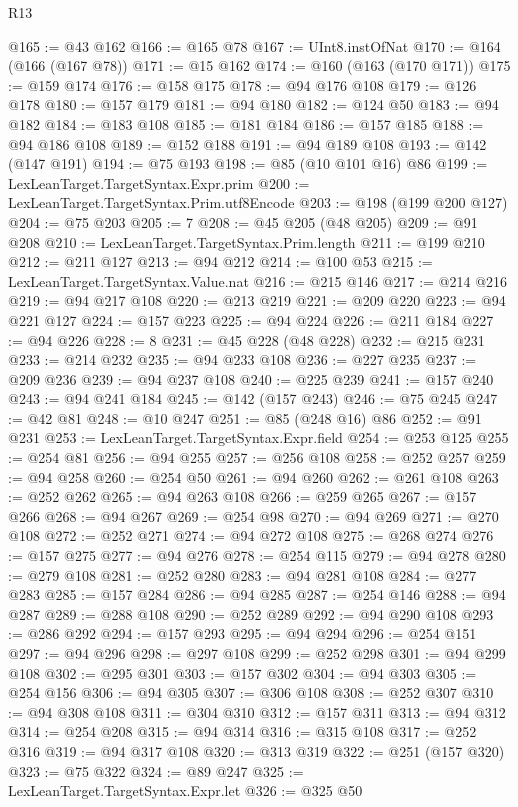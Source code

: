 \begin{lexlean}{R13}
\begin{coremodule}
@165 := @43 @162
@166 := @165 @78
@167 := UInt8.instOfNat
@170 := @164 (@166 (@167 @78))
@171 := @15 @162
@174 := @160 (@163 (@170 @171))
@175 := @159 @174
@176 := @158 @175
@178 := @94 @176 @108
@179 := @126 @178
@180 := @157 @179
@181 := @94 @180
@182 := @124 @50
@183 := @94 @182
@184 := @183 @108
@185 := @181 @184
@186 := @157 @185
@188 := @94 @186 @108
@189 := @152 @188
@191 := @94 @189 @108
@193 := @142 (@147 @191)
@194 := @75 @193
@198 := @85 (@10 @101 @16) @86
@199 := LexLeanTarget.TargetSyntax.Expr.prim
@200 := LexLeanTarget.TargetSyntax.Prim.utf8Encode
@203 := @198 (@199 @200 @127)
@204 := @75 @203
@205 := 7
@208 := @45 @205 (@48 @205)
@209 := @91 @208
@210 := LexLeanTarget.TargetSyntax.Prim.length
@211 := @199 @210
@212 := @211 @127
@213 := @94 @212
@214 := @100 @53
@215 := LexLeanTarget.TargetSyntax.Value.nat
@216 := @215 @146
@217 := @214 @216
@219 := @94 @217 @108
@220 := @213 @219
@221 := @209 @220
@223 := @94 @221 @127
@224 := @157 @223
@225 := @94 @224
@226 := @211 @184
@227 := @94 @226
@228 := 8
@231 := @45 @228 (@48 @228)
@232 := @215 @231
@233 := @214 @232
@235 := @94 @233 @108
@236 := @227 @235
@237 := @209 @236
@239 := @94 @237 @108
@240 := @225 @239
@241 := @157 @240
@243 := @94 @241 @184
@245 := @142 (@157 @243)
@246 := @75 @245
@247 := @42 @81
@248 := @10 @247
@251 := @85 (@248 @16) @86
@252 := @91 @231
@253 := LexLeanTarget.TargetSyntax.Expr.field
@254 := @253 @125
@255 := @254 @81
@256 := @94 @255
@257 := @256 @108
@258 := @252 @257
@259 := @94 @258
@260 := @254 @50
@261 := @94 @260
@262 := @261 @108
@263 := @252 @262
@265 := @94 @263 @108
@266 := @259 @265
@267 := @157 @266
@268 := @94 @267
@269 := @254 @98
@270 := @94 @269
@271 := @270 @108
@272 := @252 @271
@274 := @94 @272 @108
@275 := @268 @274
@276 := @157 @275
@277 := @94 @276
@278 := @254 @115
@279 := @94 @278
@280 := @279 @108
@281 := @252 @280
@283 := @94 @281 @108
@284 := @277 @283
@285 := @157 @284
@286 := @94 @285
@287 := @254 @146
@288 := @94 @287
@289 := @288 @108
@290 := @252 @289
@292 := @94 @290 @108
@293 := @286 @292
@294 := @157 @293
@295 := @94 @294
@296 := @254 @151
@297 := @94 @296
@298 := @297 @108
@299 := @252 @298
@301 := @94 @299 @108
@302 := @295 @301
@303 := @157 @302
@304 := @94 @303
@305 := @254 @156
@306 := @94 @305
@307 := @306 @108
@308 := @252 @307
@310 := @94 @308 @108
@311 := @304 @310
@312 := @157 @311
@313 := @94 @312
@314 := @254 @208
@315 := @94 @314
@316 := @315 @108
@317 := @252 @316
@319 := @94 @317 @108
@320 := @313 @319
@322 := @251 (@157 @320)
@323 := @75 @322
@324 := @89 @247
@325 := LexLeanTarget.TargetSyntax.Expr.let
@326 := @325 @50

\end{coremodule}
\end{lexlean}

